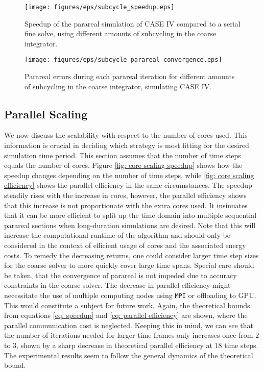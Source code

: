   \begin{figure}[h]
    \centering
    \texttt{[image: figures/eps/subcycle\_speedup.eps]}
    \caption{Speedup of the parareal simulation of CASE IV compared to a serial fine solve, using different amounts of subcycling in the coarse integrator.}
    \label{fig: temporal-subcycling}
\end{figure}

  \begin{figure}[h]
    \centering
    \texttt{[image: figures/eps/subcycle\_parareal\_convergence.eps]}
    \caption{Parareal errors during each parareal iteration for different amounts of subcycling in the coarse integrator, simulating CASE IV. }
    \label{fig: temporal-subcycling-errors}
\end{figure}

\subsection{Parallel Scaling}
\label{sec: parallel scaling}
We now discuss the scalability with respect to the number of cores used. This information is crucial in deciding which strategy is most fitting for the desired simulation time period. This section assumes that the number of time steps equals the number of cores. Figure \ref{fig: core scaling speedup} shows how the speedup changes depending on the number of time steps, while \ref{fig: core scaling efficiency} shows the parallel efficiency in the same circumstances. The speedup steadily rises with the increase in cores, however, the parallel efficiency shows that this increase is not proportionate with the extra cores used. It insinuates that it can be more efficient to split up the time domain into multiple sequential parareal sections when long-duration simulations are desired. Note that this will increase the computational runtime of the algorithm and should only be considered in the context of efficient usage of cores and the associated energy costs. 
To remedy the decreasing returns, one could consider larger time step sizes for the coarse solver to more quickly cover large time spans. Special care should be taken, that the convergence of parareal is not impeded due to accuracy constraints in the coarse solver. The decrease in parallel efficiency might necessitate the use of multiple computing nodes using \texttt{MPI} or offloading to GPU. This would constitute a subject for future work. Again, the theoretical bounds from equations \ref{eq: speedup} and \ref{eq: parallel efficiency} are shown, where the parallel communication cost is neglected. Keeping this in mind, we can see that the number of iterations needed for larger time frames only increases once from $2$ to $3$, shown by a sharp decrease in theoretical parallel efficiency at $18$ time steps. The experimental results seem to follow the general dynamics of the theoretical bound.

